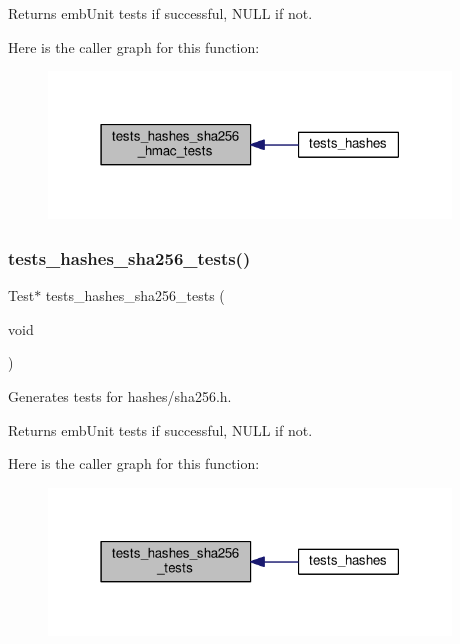 \begin{DoxyReturn}{Returns}
emb\+Unit tests if successful, N\+U\+LL if not. 
\end{DoxyReturn}
Here is the caller graph for this function\+:
\nopagebreak
\begin{figure}[H]
\begin{center}
\leavevmode
\includegraphics[width=303pt]{group__unittests_ga7a35b0db09ca01c1e2567b95bcd06227_icgraph}
\end{center}
\end{figure}
\mbox{\label{group__unittests_ga8bd7d0c07950195a3b10d69ec62d0be2}} 
\subsubsection{\texorpdfstring{tests\+\_\+hashes\+\_\+sha256\+\_\+tests()}{tests\_hashes\_sha256\_tests()}}
{\footnotesize\ttfamily Test$\ast$ tests\+\_\+hashes\+\_\+sha256\+\_\+tests (\begin{DoxyParamCaption}\item[{void}]{ }\end{DoxyParamCaption})}



Generates tests for hashes/sha256.\+h. 

\begin{DoxyReturn}{Returns}
emb\+Unit tests if successful, N\+U\+LL if not. 
\end{DoxyReturn}
Here is the caller graph for this function\+:
\nopagebreak
\begin{figure}[H]
\begin{center}
\leavevmode
\includegraphics[width=303pt]{group__unittests_ga8bd7d0c07950195a3b10d69ec62d0be2_icgraph}
\end{center}
\end{figure}
\mbox{\label{group__unittests_ga610840bb2928eb0ca34a53f887a7e884}} 
